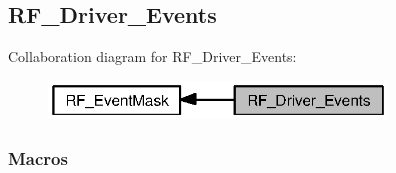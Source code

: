 \subsection{R\+F\+\_\+\+Driver\+\_\+\+Events}
\label{group___r_f___driver___events}
Collaboration diagram for R\+F\+\_\+\+Driver\+\_\+\+Events\+:
\nopagebreak
\begin{figure}[H]
\begin{center}
\leavevmode
\includegraphics[width=255pt]{group___r_f___driver___events}
\end{center}
\end{figure}
\subsubsection*{Macros}
